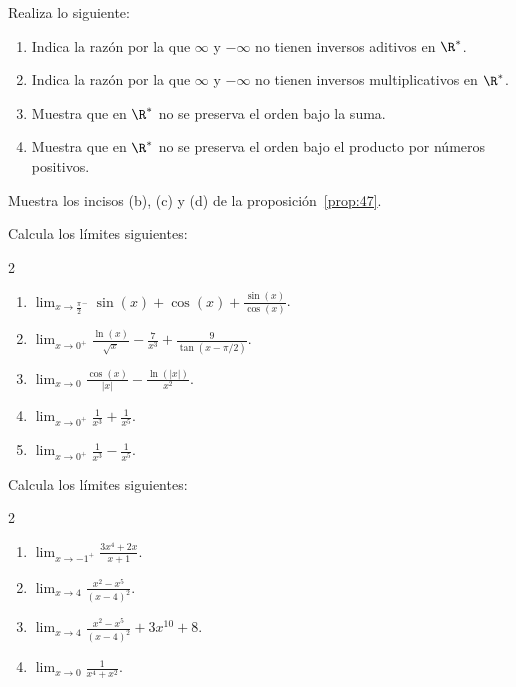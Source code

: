 \documentclass[12pt,a4paper]{book}
\begin{document}
    \begin{ejercicio}\label{ej:172}
        Realiza lo siguiente:
        \begin{enumerate}[nosep]
            \item Indica la razón por la que $\infty$ y $-\infty$ no tienen inversos aditivos en $\R^{*}$.
            \item Indica la razón por la que $\infty$ y $-\infty$ no tienen inversos multiplicativos en
            $\R^{*}$.
            \item Muestra que en $\R^{*}$ no se preserva el orden bajo la suma.
            \item Muestra que en $\R^{*}$ no se preserva el orden bajo el producto por números
            positivos.
        \end{enumerate}
    \end{ejercicio}

    \begin{ejercicio}\label{ej:173}
        Muestra los incisos (b), (c) y (d) de la proposición~\ref{prop:47}.
    \end{ejercicio}

    \begin{ejercicio}\label{ej:174}
        Calcula los límites siguientes:
        \begin{multicols}{2}
        \begin{enumerate}[nosep]
            \item $\lim_{x\to\frac{\pi}{2}^{-}}\sin(x)+\cos(x)+\frac{\sin(x)}{\cos(x)}$.
            \item $\lim_{x\to 0^{+}}\frac{\ln(x)}{\sqrt{x}}-\frac{7}{x^{3}}+\frac{9}{\tan(x-\pi/2)}$.
            \item $\lim_{x\to 0}\frac{\cos(x)}{|x|}-\frac{\ln(|x|)}{x^{2}}$.
            \item $\lim_{x\to 0^{+}}\frac{1}{x^{3}}+\frac{1}{x^{5}}$.
            \item $\lim_{x\to 0^{+}}\frac{1}{x^{3}}-\frac{1}{x^{5}}$.
        \end{enumerate}
        \end{multicols}
    \end{ejercicio}

    \begin{ejercicio}\label{ej:175}
        Calcula los límites siguientes:
        \begin{multicols}{2}
        \begin{enumerate}[nosep]
            \item $\lim_{x\to -1^{+}}\frac{3x^{4}+2x}{x+1}$.
            \item $\lim_{x\to 4}\frac{x^{2}-x^{5}}{(x-4)^{2}}$.
            \item $\lim_{x\to 4}\frac{x^{2}-x^{5}}{(x-4)^{2}}+3x^{10}+8$.
            \item $\lim_{x\to 0}\frac{1}{x^{4}+x^{2}}$.
        \end{enumerate}
        \end{multicols}
    \end{ejercicio}
\end{document}
